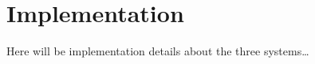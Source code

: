 \chapter{Implementation}

Here will be implementation details about the three systems\ldots

\nlipsum
